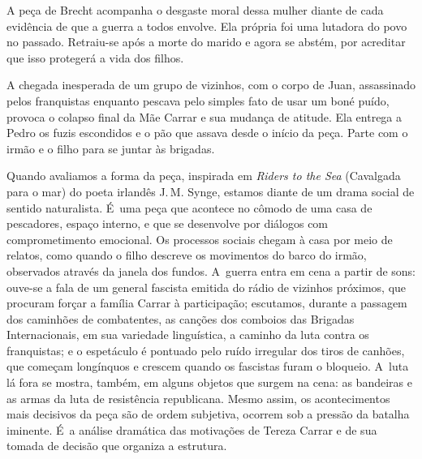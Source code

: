 {A peça de Brecht acompanha o desgaste moral dessa mulher diante de cada
evidência de que a guerra a todos envolve. Ela própria foi uma lutadora
do povo no passado. Retraiu-se após a morte do marido e agora se abstém,
por acreditar que isso protegerá a vida dos filhos.

A chegada inesperada de um grupo de vizinhos, com o corpo de Juan,
assassinado pelos franquistas enquanto pescava pelo simples fato de
usar um boné puído, provoca o colapso final da Mãe Carrar e sua mudança
de atitude. Ela entrega a Pedro os fuzis escondidos e o pão que assava
desde o início da peça. Parte com o irmão e o filho para se juntar às
brigadas.

Quando avaliamos a forma da peça, inspirada em {\it Riders to the Sea}
(Cavalgada para o mar) do poeta irlandês J.\,M. Synge, estamos
diante de um drama social de sentido naturalista. É~uma peça que
acontece no cômodo de uma casa de pescadores, espaço interno, e que se
desenvolve por diálogos com comprometimento emocional. Os processos
sociais chegam à casa por meio de relatos, como quando o filho descreve
os movimentos do barco do irmão, observados através da janela dos
fundos. A~guerra entra em cena a partir de sons: ouve-se a fala de um
general fascista emitida do rádio de vizinhos próximos, que procuram
forçar a família Carrar à participação; escutamos, durante a passagem
dos caminhões de combatentes, as canções dos comboios das Brigadas
Internacionais, em sua variedade linguística, a caminho da luta contra
os franquistas; e o espetáculo é pontuado pelo ruído irregular dos tiros
de canhões, que começam longínquos e crescem quando os fascistas furam o
bloqueio. A~luta lá fora se mostra, também, em alguns objetos que surgem
na cena: as bandeiras e as armas da luta de resistência republicana.
Mesmo assim, os acontecimentos mais decisivos da peça são de ordem
subjetiva, ocorrem sob a pressão da batalha iminente. É~a análise
dramática das motivações de Tereza Carrar e de sua tomada de decisão que
organiza a estrutura.

}
